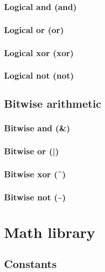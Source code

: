 \documentclass{article}
\theoremstyle{definition}
\begin{document}
\subsubsection{Logical and (and)}

\subsubsection{Logical or (or)}

\subsubsection{Logical xor (xor)}

\subsubsection{Logical not (not)}

\subsection{Bitwise arithmetic}

\subsubsection{Bitwise and (\&)}
\libfcn{\&}

\subsubsection{Bitwise or (|)}
\libfcn{|}

\subsubsection{Bitwise xor (\^{})}
\libfcn{\^{}}

\subsubsection{Bitwise not (\textasciitilde{})}

\pagebreak

\section{Math library}

\subsection{Constants}
\end{document}
